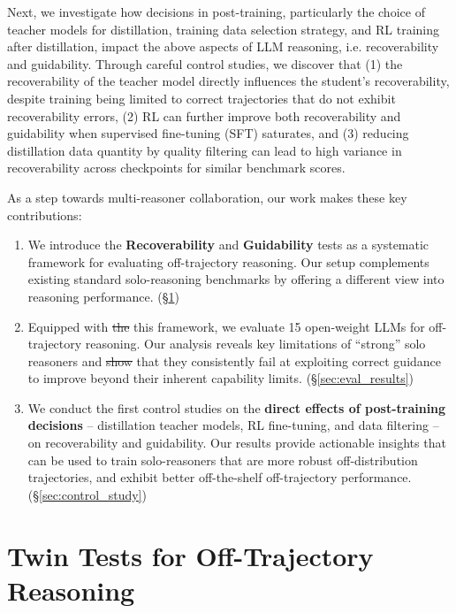 \documentclass{article} %
\providecommand{\DIFaddtex}[1]{{\protect\color{blue}\uwave{#1}}} %
\providecommand{\DIFdeltex}[1]{{\protect\color{red}\sout{#1}}}                      %
\providecommand{\DIFaddbegin}{} %
\providecommand{\DIFaddend}{} %
\providecommand{\DIFdelbegin}{} %
\providecommand{\DIFdelend}{} %
\providecommand{\DIFadd}[1]{\texorpdfstring{\DIFaddtex{#1}}{#1}} %
\providecommand{\DIFdel}[1]{\texorpdfstring{\DIFdeltex{#1}}{}} %
\newcommand{\DIFscaledelfig}{0.5}
\newlength{\DIFdelgraphicswidth} %
\newlength{\DIFdelgraphicsheight} %
\newcommand{\DIFaddincludegraphics}[2][]{{\color{blue}\fbox{\DIFOincludegraphics[#1]{#2}}}} %
\newcommand{\DIFdelincludegraphics}[2][]{%
\sbox{\DIFdelgraphicsbox}{\DIFOincludegraphics[#1]{#2}}%
\settoboxwidth{\DIFdelgraphicswidth}{\DIFdelgraphicsbox} %
\settoboxtotalheight{\DIFdelgraphicsheight}{\DIFdelgraphicsbox} %
\scalebox{\DIFscaledelfig}{%
\parbox[b]{\DIFdelgraphicswidth}{\usebox{\DIFdelgraphicsbox}\\[-\baselineskip] \rule{\DIFdelgraphicswidth}{0em}}\llap{\resizebox{\DIFdelgraphicswidth}{\DIFdelgraphicsheight}{%
\setlength{\unitlength}{\DIFdelgraphicswidth}%
\begin{picture}(1,1)%
\thicklines\linethickness{2pt} %
{\color[rgb]{1,0,0}\put(0,0){\framebox(1,1){}}}%
{\color[rgb]{1,0,0}\put(0,0){\line( 1,1){1}}}%
{\color[rgb]{1,0,0}\put(0,1){\line(1,-1){1}}}%
\end{picture}%
}\hspace*{3pt}}} %
} %
\DeclareRobustCommand{\DIFaddbegin}{\DIFOaddbegin \let\includegraphics\DIFaddincludegraphics} %
\DeclareRobustCommand{\DIFaddend}{\DIFOaddend \let\includegraphics\DIFOincludegraphics} %
\DeclareRobustCommand{\DIFdelbegin}{\DIFOdelbegin \let\includegraphics\DIFdelincludegraphics} %
\DeclareRobustCommand{\DIFdelend}{\DIFOaddend \let\includegraphics\DIFOincludegraphics} %
\begin{document}
Next, we investigate how decisions in post-training, particularly the choice of teacher models for distillation, training data selection strategy, and RL training after distillation, impact the above aspects of LLM reasoning, i.e. recoverability and guidability. Through careful control studies, we discover that (1) the recoverability of the teacher model directly influences the student's recoverability, despite training being limited to correct trajectories that do not exhibit recoverability errors, (2) RL can further improve both recoverability and guidability when supervised fine-tuning (SFT) saturates, and  (3) reducing distillation data quantity by quality filtering can lead to high variance in recoverability across checkpoints for similar benchmark scores.

As a step towards multi-reasoner collaboration, our work makes these key contributions:
\begin{enumerate}
[leftmargin=*, itemsep=0pt, topsep=0pt]
    \item We introduce the \textbf{Recoverability} and \textbf{Guidability} tests as a systematic framework for evaluating off-trajectory reasoning. Our setup complements existing standard solo-reasoning benchmarks by offering a different view into reasoning performance. (\S \ref{sec:twin_test_desc})
    \item Equipped with \DIFdelbegin \DIFdel{the }\DIFdelend this framework, we evaluate 15 open-weight LLMs for off-trajectory reasoning. Our analysis reveals key limitations of ``strong'' solo reasoners and \DIFdelbegin \DIFdel{show }\DIFdelend \DIFaddbegin \DIFadd{shows }\DIFaddend that they consistently fail at exploiting correct guidance to improve beyond their inherent capability limits.
    (\S \ref{sec:eval_results})
    \item We conduct the first control studies on the \textbf{direct effects of post-training decisions} -- distillation teacher models, RL fine-tuning, and data filtering -- on recoverability and guidability. Our results provide actionable insights that can be used to train solo-reasoners that are more robust off-distribution trajectories, and exhibit better off-the-shelf off-trajectory performance.  (\S \ref{sec:control_study})
\end{enumerate}

\section{Twin Tests for Off-Trajectory Reasoning}
\label{sec:twin_test_desc}
\end{document}
